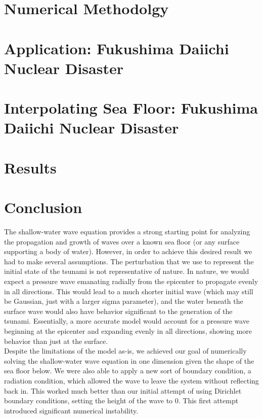 \documentclass[12pt,a4]{article}
\begin{document}
\section{Numerical Methodolgy}


\section{Application: Fukushima Daiichi Nuclear Disaster}


\section{Interpolating Sea Floor: Fukushima Daiichi Nuclear Disaster}


\section{Results }


\section{Conclusion}
\noindent The shallow-water wave equation provides a strong starting point for analyzing the propagation and growth of waves over a known sea floor (or any surface supporting a body of water). However, in order to achieve this desired result we had to make several assumptions. The perturbation that we use to represent the initial state of the tsunami is not representative of nature. In nature, we would expect a pressure wave emanating radially from the epicenter to propagate evenly in all directions. This would lead to a much shorter initial wave (which may still be Gaussian, just with a larger sigma parameter), and the water beneath the surface wave would also have behavior significant to the generation of the tsunami. Essentially, a more accurate model would account for a pressure wave beginning at the epicenter and expanding evenly in all directions, showing more behavior than just at the surface.\\

\noindent Despite the limitations of the model as-is, we achieved our goal of numerically solving the shallow-water wave equation in one dimension given the shape of the sea floor below. We were also able to apply a new sort of boundary condition, a radiation condition, which allowed the wave to leave the system without reflecting back in. This worked much better than our initial attempt of using Dirichlet boundary conditions, setting the height of the wave to $0$. This first attempt introduced significant numerical instability.\\
\end{document}
